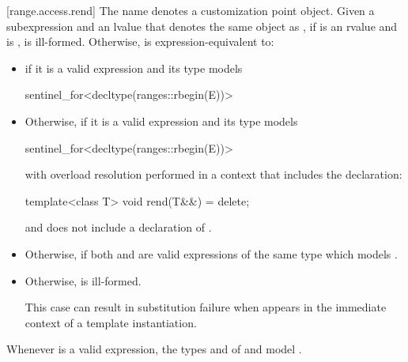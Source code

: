 [range.access.rend]{}
\pnum
The name  denotes a customization point
object.
Given a subexpression  and
an lvalue  that denotes the same object as ,
if  is an rvalue and
 is ,
 is ill-formed.
Otherwise,
 is
expression-equivalent to:
\begin{itemize}
\item
  if it is a valid expression and its type  models
\begin{codeblock}
sentinel_for<decltype(ranges::rbegin(E))>
\end{codeblock}

\item
  Otherwise,  if it is a valid
  expression and its type  models
\begin{codeblock}
sentinel_for<decltype(ranges::rbegin(E))>
\end{codeblock}
  with overload
  resolution performed in a context that includes the declaration:
\begin{codeblock}
template<class T> void rend(T&&) = delete;
\end{codeblock}
  and does not include a declaration of .

\item
  Otherwise,  if both
   and  are valid
  expressions of the same type  which models
  .

\item
  Otherwise,  is ill-formed.
  \begin{note}
  This case can result in substitution failure when 
  appears in the immediate context of a template instantiation.
  \end{note}
\end{itemize}

\pnum
\begin{note}
Whenever  is a valid expression,
the types  and  of
 and 
model .
\end{note}

